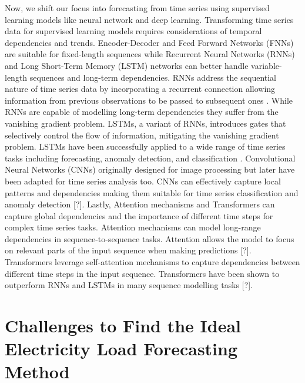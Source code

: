 \documentclass[mstat,12pt]{unswthesis}
\begin{document}
Now, we shift our focus into forecasting from time series using
supervised learning models like neural network and deep learning.
Transforming time series data for supervised learning models requires
considerations of temporal dependencies and trends. Encoder-Decoder and
Feed Forward Networks (FNNs) are suitable for fixed-length sequences
while Recurrent Neural Networks (RNNs) and Long Short-Term Memory (LSTM)
networks can better handle variable-length sequences and long-term
dependencies. RNNs address the sequential nature of time series data by
incorporating a recurrent connection allowing information from previous
observations to be passed to subsequent ones \cite{Hochreiter1997Long}.
While RNNs are capable of modelling long-term dependencies they suffer
from the vanishing gradient problem. LSTMs, a variant of RNNs,
introduces gates that selectively control the flow of information,
mitigating the vanishing gradient problem. LSTMs have been successfully
applied to a wide range of time series tasks including forecasting,
anomaly detection, and classification \cite{HochreiterSchmidhuber1997}.
Convolutional Neural Networks (CNNs) originally designed for image
processing but later have been adapted for time series analysis too.
CNNs can effectively capture local patterns and dependencies making them
suitable for time series classification and anomaly detection {[}?{]}.
Lastly, Attention mechanisms and Transformers can capture global
dependencies and the importance of different time steps for complex time
series tasks. Attention mechanisms can model long-range dependencies in
sequence-to-sequence tasks. Attention allows the model to focus on
relevant parts of the input sequence when making predictions {[}?{]}.
Transformers leverage self-attention mechanisms to capture dependencies
between different time steps in the input sequence. Transformers have
been shown to outperform RNNs and LSTMs in many sequence modelling tasks
{[}?{]}.

\section{Challenges to Find the Ideal Electricity Load Forecasting
Method}\label{challenges-to-find-the-ideal-electricity-load-forecasting-method}
\end{document}
